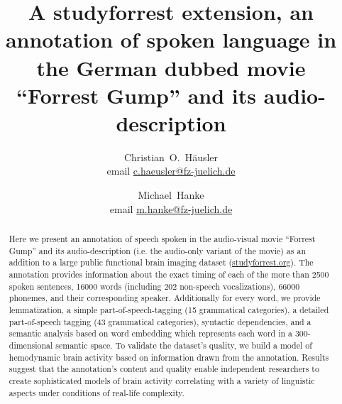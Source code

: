 \documentclass[10pt,a4paper,onecolumn]{article}
\begin{document}



\title{A studyforrest extension, an annotation of spoken language in the German dubbed movie ``Forrest Gump'' and its audio-description}

\author[1, 2]{Christian~O.~Häusler \\ email \href{mailto:c.haeusler@fz-juelich.de}{c.haeusler@fz-juelich.de} }
\author[1, 2]{Michael~Hanke \\ email \href{mailto:m.hanke@fz-juelich.de}{m.hanke@fz-juelich.de} }


\maketitle




\thispagestyle{fancy}

\begin{abstract}
Here we present an annotation of speech spoken in the audio-visual movie
``Forrest Gump'' and its audio-description (i.e. the audio-only variant of the
movie) as an addition to a large public functional brain imaging dataset
(\href{www.studyforrest.org}{studyforrest.org}).
The annotation provides information about the exact timing of each of the more
than 2500 spoken sentences, 16000 words (including 202 non-speech
vocalizations), 66000 phonemes, and their corresponding speaker.
Additionally for every word, we provide lemmatization, a simple
part-of-speech-tagging (15 grammatical categories), a detailed part-of-speech
tagging (43 grammatical categories), syntactic dependencies, and a semantic
analysis based on word embedding which represents each word in a
300-dimensional semantic space.
To validate the dataset's quality, we build a model of hemodynamic brain
activity based on information drawn from the annotation.
Results suggest that the annotation's content and quality enable independent
researchers to create sophisticated models of brain activity correlating with a
variety of linguistic aspects under conditions of real-life complexity.
\end{abstract} 
\end{document}

